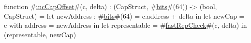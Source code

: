 function #\hyperref[zincCapOffset]{incCapOffset}#(c, delta) : (CapStruct, #\hyperref[zbits]{bits}#(64)) -> (bool, CapStruct) =
    let newAddress : #\hyperref[zbits]{bits}#(64) = c.address + delta in
    let newCap     = { c with address = newAddress } in
    let representable = #\hyperref[zfastRepCheck]{fastRepCheck}#(c, delta) in
    (representable, newCap)
